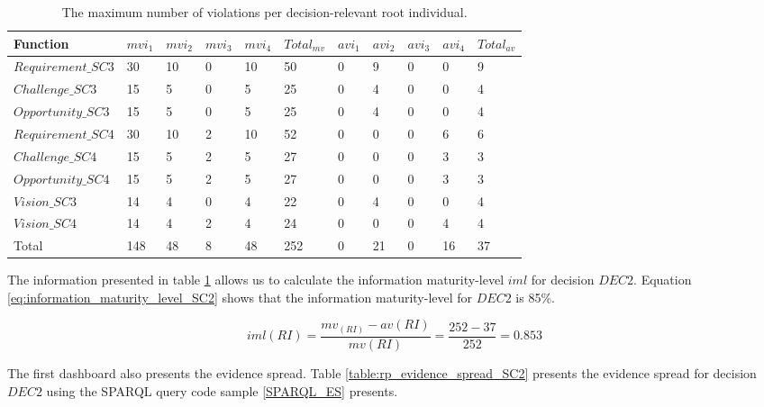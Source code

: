 \begin{table}[H]
\centering
\caption{The maximum number of violations per decision-relevant root individual.}
\begin{tabular}{| p{3cm} | p{0.8cm} | p{0.8cm} | p{0.8cm} | p{0.8cm} | p{1.2cm} | p{0.8cm} | p{0.8cm} | p{0.8cm} | p{0.8cm} | p{1.2cm} |}
\hline
\rowcolor{document}
\color{documentText}Function & \color{documentText}$mvi_1$ & \color{documentText}$mvi_2$ & \color{documentText}$mvi_3$ & \color{documentText}$mvi_4$ & \color{documentText}$Total_{mv}$ & \color{documentText}$avi_1$ & \color{documentText}$avi_2$ & \color{documentText}$avi_3$ & \color{documentText}$avi_4$ & \color{documentText}$Total_{av}$ \\
\hline
$Requirement\_SC3$ 	& 30 & 10 & 0 & 10 & 50 & 0 & 9 & 0 & 0 & 9\\
\hdashline
$Challenge\_SC3$ 	& 15 & 5 & 0 & 5 & 25 & 0 & 4 & 0 & 0 & 4 \\
\hdashline
$Opportunity\_SC3$ 	& 15 & 5 & 0 & 5 & 25 & 0 & 4 & 0 & 0 & 4 \\
\hdashline
$Requirement\_SC4$ 	& 30 & 10 & 2 & 10 & 52 & 0 & 0 & 0 & 6 & 6 \\
\hdashline
$Challenge\_SC4$ 	& 15 & 5 & 2 & 5 & 27 & 0 & 0 & 0 & 3 & 3 \\ 
\hdashline
$Opportunity\_SC4$ 	& 15 & 5 & 2 & 5 & 27 & 0 & 0 & 0 & 3 & 3 \\ 
\hdashline
$Vision\_SC3$ 		& 14 & 4 & 0 & 4 & 22& 0 & 4 & 0 & 0 & 4 \\
\hdashline
$Vision\_SC4$ 		& 14 & 4 & 2 & 4 & 24 & 0 & 0 & 0 & 4 & 4 \\
\hdashline
Total 				& 148 & 48 & 8 & 48 & 252 & 0 & 21 & 0 & 16 & 37 \\
\hline
\end{tabular}
\label{table:rp_maximum_evidence_sc2}
\end{table}

The information presented in table \ref{table:rp_maximum_evidence_sc2} allows us to calculate the information maturity-level $iml$ for decision $DEC2$. Equation \ref{eq:information_maturity_level_SC2} shows that the information maturity-level for $DEC2$ is 85\%.

\begin{equation} \label{eq:information_maturity_level_SC2}
iml(RI) = \dfrac{mv_(RI)-av(RI)}{mv(RI)} = \dfrac{252-37}{252} = 0.853
\end{equation}

The first dashboard also presents the evidence spread. Table \ref{table:rp_evidence_spread_SC2} presents the evidence spread for decision $DEC2$ using the SPARQL query code sample \ref{SPARQL_ES} presents.

